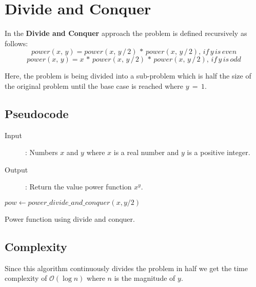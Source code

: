 \documentclass[11pt,a4paper]{report}
\theoremstyle{definition}
\theoremstyle{remark}
\begin{document}
        \clearpage

        \section{Divide and Conquer}
        In the \textbf{Divide and Conquer} approach the problem is defined recursively as follows:
            $$power(x, \, y) = power(x, \, y \, / \, 2) \, * \, power(x, \, y \, / \, 2), \, if \, y \, is \, even$$
            $$power(x, \, y) = x \, * \, power(x, \, y \, / \, 2) \, * \, power(x, \, y \, / \, 2), \, if \, y \, is \, odd$$
        
        Here, the problem is being divided into a sub-problem which is half the size of the original problem until the base case is reached where $y \, = \, 1.$
        
            \subsection{Pseudocode}
            	\begin{description}
                	\item [Input]: Numbers $x$ and $y$ where $x$ is a real number and $y$ is a positive integer.
                	\item [Output]: Return the value power function $x^y$.
            	\end{description}
            	
            	\begin{algorithm}
                        
                        $pow \gets power\_divide\_and\_conquer(x, y / 2)$\;
                        
                \caption{Power function using divide and conquer.}
                \label{alg:power-divide-and-conquer}
            	\end{algorithm}
            
            \subsection{Complexity}
            Since this algorithm continuously divides the problem in half we get the time complexity of $\mathcal{O}(\log n)$ where $n$ is the magnitude of $y$.
\end{document}
